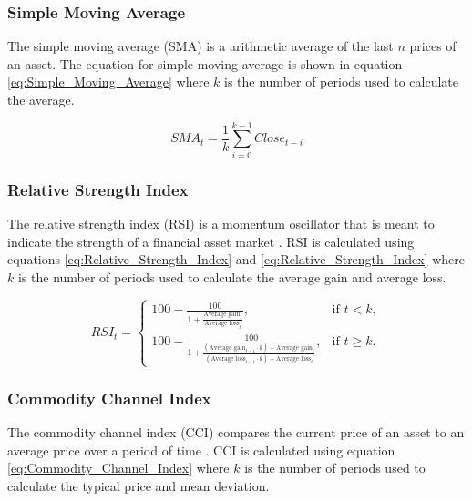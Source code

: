 \documentclass[journal]{new-aiaa}
\begin{document}
\subsubsection{Simple Moving Average}\label{sec:Technical_Analysis:Simple_Moving_Average}
The simple moving average (SMA) is a arithmetic average of the last $n$ prices of an asset.
The equation for simple moving average is shown in equation \ref{eq:Simple_Moving_Average} where $k$ is the number of periods used to calculate the average.

\begin{equation}\label{eq:Simple_Moving_Average}
        SMA_t = \frac{1}{k} \sum_{i=0}^{k-1} Close_{t-i}
\end{equation}

\subsubsection{Relative Strength Index}\label{sec:Technical_Analysis:Relative_Strength_Index}
The relative strength index (RSI) is a momentum oscillator that is meant to indicate the strength of a financial asset market \cite{wilder1978new}.
RSI is calculated using equations \ref{eq:Relative_Strength_Index} and \ref{eq:Relative_Strength_Index} where $k$ is the number of periods used to calculate the average gain and average loss.

\begin{equation}\label{eq:Relative_Strength_Index}
        RSI_t = 
        \begin{cases} 
                100 - \frac{100}{1 + \frac{\text{Average gain}_t}{\text{Average loss}_t}}, & \text{if } t < k, \\[10pt]
                100 - \frac{100}{1 + \frac{(\text{Average gain}_{t-1} \cdot k) + \text{Average gain}_t}{(\text{Average loss}_{t-1} \cdot k) + \text{Average loss}_t}}, & \text{if } t \geq k.
        \end{cases}
\end{equation}

\subsubsection{Commodity Channel Index}\label{sec:Technical_Analysis:Commodity_Channel_Index}
The commodity channel index (CCI) compares the current price of an asset to an average price over a period of time \cite{lambert1983commodity}.
CCI is calculated using equation \ref{eq:Commodity_Channel_Index} where $k$ is the number of periods used to calculate the typical price and mean deviation.
\end{document}
